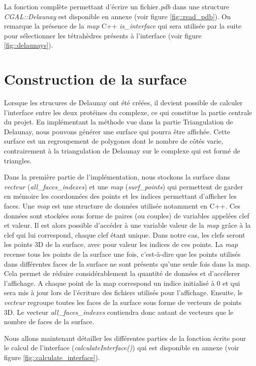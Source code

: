 La fonction complète permettant d'écrire un fichier\textit{.pdb} dans une structure
\textit{CGAL::Delaunay} est disponible en annexe (voir figure \ref{fig::read_pdb}).
On remarque la présence de la \textit{map} C++ \textit{is\_interface} qui sera utilisée par la suite
pour sélectionner les tétrahèdres présents à l'interface (voir figure \ref{fig::delaunays}).




\section{Construction de la surface}


Lorsque les strucures de Delaunay ont été créées, il devient possible de calculer l'interface
entre les deux protéines du complexe, ce qui constitue la partie centrale du projet.
En implémentant la méthode vue dans la partie Triangulation de Delaunay, nous pouvons générer
une surface qui pourra être affichée. Cette surface est un regroupement de polygones
dont le nombre de côtés varie, contrairement à la triangulation de Delaunay sur le complexe
qui est formé de triangles.

Dans la première partie de l'implémentation, nous stockons la surface dans \textit{vecteur}
(\textit{all\_faces\_indexes})
et une \textit{map} (\textit{surf\_points})
qui permettent de garder en mémoire les coordonnées des points
et les indices permettant d'afficher les faces. Une \textit{map} est une structure de données
utilisée notamment en C++. Ces données sont stockées sous forme de paires (ou couples)
de variables appelées clef et valeur. Il est alors possible d'accéder à une variable
valeur de la \textit{map} grâce à la clef qui lui correspond, chaque clef étant unique.
Dans notre cas, les clefs seront les points 3D de la surface, avec pour valeur les indices
de ces points.
La \textit{map}  recense tous les points
de la surface une fois, c'est-à-dire que les points utilisés dans différentes faces de la surface
ne sont présents qu'une seule fois dans la map. Cela permet de réduire considérablement
la quantité de données et d'accélerer l'affichage. A chaque point de la map correspond
un indice initialisé à 0 et qui sera mis à jour lors de l'écriture des fichiers utilisés
pour l'affichage. Ensuite, le \textit{vecteur} regroupe toutes les faces de la surface
sous forme de vecteurs de points 3D. Le vecteur \textit{all\_faces\_indexes} contiendra
donc autant de vecteurs que le nombre de faces de la surface.

Nous allons maintenant détailler les différentes parties de la fonction écrite pour
le calcul de l'interface (\textit{calculateInterface()}) qui est disponible en
annexe (voir figure \ref{fig::calculate_interface}).

